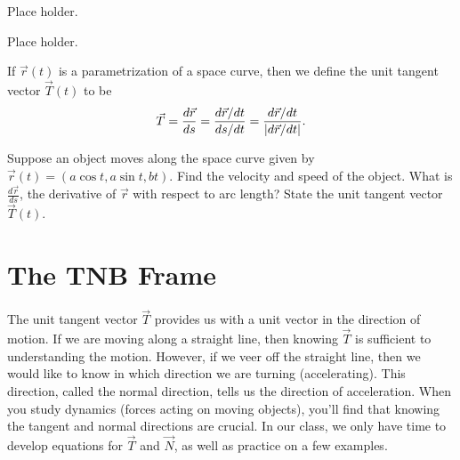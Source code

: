 \begin{problem}
Place holder. 
\end{problem}

\begin{problem}%
Place holder. 
\end{problem}


\begin{definition}\label{def unit tangent vector}
 If $\vec r(t)$ is a parametrization of a space curve, then we define the unit tangent vector $\vec T(t)$ to be 
$$\vec T = \displaystyle\frac{d\vec r}{ds}=\displaystyle\frac{d\vec r/dt}{ds/dt} = \frac{d\vec r/dt}{|d \vec r/dt|}.$$
\end{definition}

\begin{problem}
%
 Suppose an object moves along the space curve given by  $\vec r(t)=(a\cos t,a\sin t,b t)$. Find the velocity and speed of the object. What is $\frac{d\vec r}{ds}$, the derivative of $\vec r$ with respect to arc length?  State the unit tangent vector $\vec T(t)$.
\end{problem}

\section{The TNB Frame}
The unit tangent vector $\vec T$ provides us with a unit vector in the direction of motion. If we are moving along a straight line, then knowing $\vec T$ is sufficient to understanding the motion.  However, if we veer off the straight line, then we would like to know in which direction we are turning (accelerating).  This direction, called the normal direction, tells us the direction of acceleration. When you study dynamics (forces acting on moving objects), you'll find that knowing the tangent and normal directions are crucial. In our class, we only have time to develop equations for $\vec T$ and $\vec N$, as well as practice on a few examples. 


